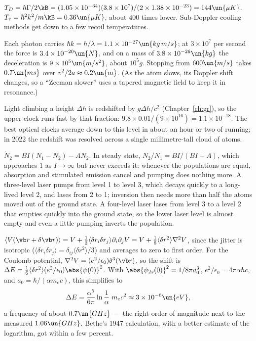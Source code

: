  $T_D = \hbar\Gamma/2\kB = (1.05\times10^{-34})(3.8\times10^7)/(2\times1.38\times10^{-23}) = 144\un{\mu K}$. $T_r = \hbar^2k^2/m\kB = 0.36\un{\mu K}$, about $400$ times lower. Sub-Doppler cooling methods get down to a few recoil temperatures.

 Each photon carries $\hbar k = h/\lambda = 1.1\times10^{-27}\un{kg\,m/s}$; at $3\times10^7$ per second the force is $3.4\times10^{-20}\un{N}$, and on a mass of $3.8\times10^{-26}\un{kg}$ the deceleration is $9\times10^5\un{m/s^2}$, about $10^5g$. Stopping from $600\un{m/s}$ takes $0.7\un{ms}$ over $v^2/2a\approx0.2\un{m}$. (As the atom slows, its Doppler shift changes, so a ``Zeeman slower'' uses a tapered magnetic field to keep it in resonance.)

 Light climbing a height $\Delta h$ is redshifted by $g\Delta h/c^2$ (Chapter~\ref{ch:gr}), so the upper clock runs fast by that fraction: $9.8\times0.01/(9\times10^{16}) = 1.1\times10^{-18}$. The best optical clocks average down to this level in about an hour or two of running; in 2022 the redshift was resolved across a single millimetre-tall cloud of atoms.

 $\dot N_2 = BI(N_1-N_2) - AN_2$. In steady state, $N_2/N_1 = BI/(BI+A)$, which approaches $1$ as $I\to\infty$ but never exceeds it: whenever the populations are equal, absorption and stimulated emission cancel and pumping does nothing more. A three-level laser pumps from level 1 to level 3, which decays quickly to a long-lived level 2, and lases from 2 to 1; inversion then needs more than half the atoms moved out of the ground state. A four-level laser lases from level 3 to a level 2 that empties quickly into the ground state, so the lower laser level is almost empty and even a little pumping inverts the population.

 $\langle V(\vb r+\delta\vb r)\rangle = V + \tfrac12\langle\delta r_i\delta r_j\rangle\partial_i\partial_jV = V + \tfrac16\langle\delta r^2\rangle\nabla^2V$, since the jitter is isotropic ($\langle\delta r_i\delta r_j\rangle = \delta_{ij}\langle\delta r^2\rangle/3$) and averages to zero to first order. For the Coulomb potential, $\nabla^2V = (e^2/\epsilon_0)\delta^3(\vb r)$, so the shift is $\Delta E = \tfrac16\langle\delta r^2\rangle(e^2/\epsilon_0)\abs{\psi(0)}^2$. With $\abs{\psi_{2s}(0)}^2 = 1/8\pi a_0^3$, $e^2/\epsilon_0 = 4\pi\alpha\hbar c$, and $a_0 = \hbar/(\alpha m_ec)$, this simplifies to
\[
  \Delta E = \frac{\alpha^5}{6\pi}\ln\frac1\alpha\;m_ec^2\approx3\times10^{-6}\un{eV},
\]
a frequency of about $0.7\un{GHz}$ --- the right order of magnitude next to the measured $1.06\un{GHz}$. Bethe's 1947 calculation, with a better estimate of the logarithm, got within a few percent.
